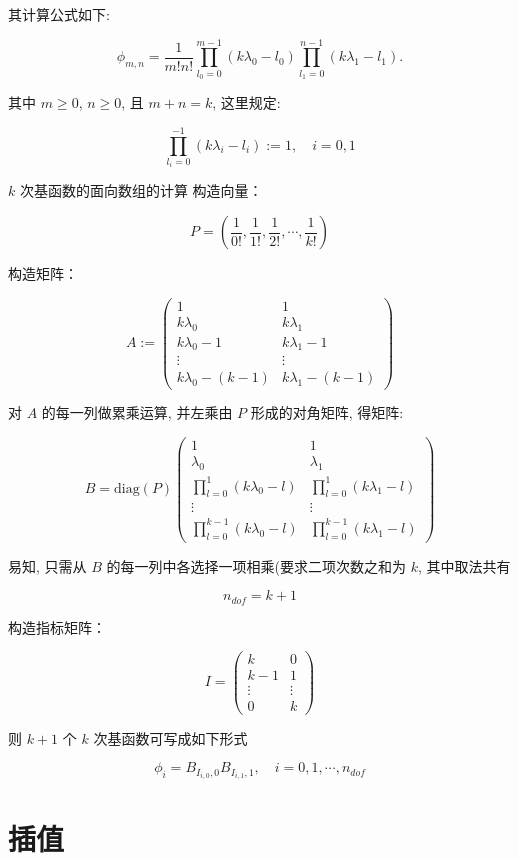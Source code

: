 \documentclass{article}
\begin{document}
其计算公式如下:

\[
\phi_{m,n} = \frac{1}{m!n!}\prod_{l_0 = 0}^{m - 1}
(k\lambda_0 - l_0) \prod_{l_1 = 0}^{n-1}(k\lambda_1 -
l_1).
\]

其中 $ m\geq 0$, $ n\geq 0 $, 且 $ m+n=k $, 这里规定:

\[
 \prod_{l_i=0}^{-1}(k\lambda_i - l_i) := 1,\quad i=0, 1
\]

$k$ 次基函数的面向数组的计算
构造向量： 

\[
P = ( \frac{1}{0!},  \frac{1}{1!}, \frac{1}{2!}, \cdots, \frac{1}{k!})
\]

构造矩阵： 

\[
A :=
\begin{pmatrix}
1  &  1  \\
k\lambda_0 & k\lambda_1\\
k\lambda_0 - 1 & k\lambda_1 - 1\\
\vdots & \vdots \\
k\lambda_0 - (k - 1) & k\lambda_1 - (k - 1)
\end{pmatrix}
\]

对 $A$ 的每一列做累乘运算, 并左乘由 $P$ 形成的对角矩阵, 得矩阵:

\[
B = \mathrm{diag}(P)
\begin{pmatrix}
1 & 1\\
\lambda_0 & \lambda_1\\
\prod_{l=0}^{1}(k\lambda_0 - l) & \prod_{l=0}^{1}(k\lambda_1 - l)\\
\vdots & \vdots \\
\prod_{l=0}^{k-1}(k\lambda_0 - l) & \prod_{l=0}^{k-1}(k\lambda_1 - l)
\end{pmatrix}
\]

易知, 只需从 $B$ 的每一列中各选择一项相乘(要求二项次数之和为 $k$,
其中取法共有

\[
n_{dof} = {k+1}
\]

构造指标矩阵：

\[
I = \begin{pmatrix}
k  & 0 \\ k-1 & 1 \\ \vdots & \vdots \\ 0 & k
\end{pmatrix}
\]

则 $k+1$ 个 $k$ 次基函数可写成如下形式

\[
\phi_i = B_{I_{i,0}, 0}B_{I_{i, 1},1}, \quad i = 0, 1, \cdots, n_{dof}
\]

\section{插值}
\end{document}

